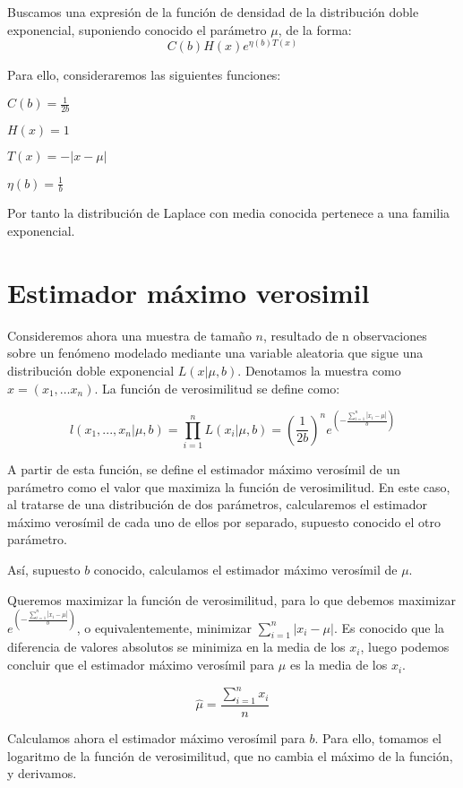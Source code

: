 \documentclass[a4paper, 10pt]{article} %
\begin{document}
Buscamos una expresión de la función de densidad de la distribución doble exponencial, suponiendo conocido el parámetro $\mu$, de la forma: $$C\left(b\right)H(x)e^{\eta(b)T(x)}$$

Para ello, consideraremos las siguientes funciones: 
\begin{description}
\item$C\left(b\right) = \frac{1}{2b} $
\item$H(x) = 1$
\item$T(x) = -|x-\mu|$
\item$\eta(b) = \frac{1}{b}$
\end{description}

Por tanto la distribución de Laplace con media conocida pertenece a una familia exponencial. 

\section{Estimador máximo verosimil}

Consideremos ahora una muestra de tamaño $n$, resultado de n observaciones sobre un fenómeno modelado
mediante una variable aleatoria que sigue una distribución doble exponencial $L(x|\mu, b)$. Denotamos
la muestra como $x = \left(x_1, \dots x_n\right)$. La función de verosimilitud se define como:

$$l(x_1,...,x_n|\mu, b)=\prod_{i=1}^{n} L(x_i|\mu, b) = \left(\frac{1}{2b}\right)^n 
e^{\left(-\frac{\sum_{i=1}^{n}|x_i-\mu|}{b}\right)}$$

A partir de esta función, se define el estimador máximo verosímil de un parámetro como el valor que
maximiza la función de verosimilitud. En este caso, al tratarse de una distribución de dos parámetros,
calcularemos el estimador máximo verosímil de cada uno de ellos por separado, supuesto conocido el otro parámetro. 

Así, supuesto $b$ conocido, calculamos el estimador máximo verosímil de $\mu$. 

Queremos maximizar la función de verosimilitud, para lo que debemos maximizar $e^{\left(-\frac{\sum_{i=1}^{n}|x_i-\mu|}{b}\right)}$,
o equivalentemente, minimizar $\sum_{i=1}^{n}|x_i-\mu|$. Es conocido que la diferencia de valores absolutos se minimiza
en la media de los $x_i$, luego podemos concluir que el estimador máximo verosímil para $\mu$ es la media de los $x_i$. 

$$\hat{\mu} = \frac{\sum_{i=1}^{n}x_i}{n}$$


Calculamos ahora el estimador máximo verosímil para $b$. Para ello, tomamos el logaritmo de la función de verosimilitud,
que no cambia el máximo de la función, y derivamos. 
\end{document}
